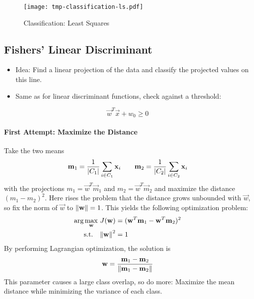 				\begin{figure}
					\centering
					\texttt{[image: tmp-classification-ls.pdf]}
					\caption{Classification: Least Squares}
					\label{fig:classificationLS}
				\end{figure}

		\subsection{Fishers' Linear Discriminant}
			\begin{itemize}
				\item Idea: Find a linear projection of the data and classify the projected values on this line.
				\item Same as for linear discriminant functions, check against a threshold:
			\end{itemize}
			\begin{equation}
				\vec{w}^T \vec{x} + w_0 \geq 0
			\end{equation}
			
			\paragraph{First Attempt: Maximize the Distance}
				Take the two means
				\begin{equation}
					\boldsymbol{\mathrm{m}}_1 = \frac{1}{\abs{C_1}} \sum_{i \in C_1} \boldsymbol{\mathrm{x}}_i \qquad \boldsymbol{\mathrm{m}}_2 = \frac{1}{\abs{C_2}} \sum_{i \in C_2} \boldsymbol{\mathrm{x}}_i
				\end{equation}
				with the projections \( m_1 = \vec{w}^T \vec{m}_1 \) and \( m_2 = \vec{w}^T \vec{m}_2 \) and maximize the distance \( (m_1 - m_2)^2 \). Here rises the problem that the distance grows unbounded with \(\vec{w}\), so fix the norm of \( \vec{w} \) to \( \norm{\boldsymbol{\mathrm{w}}} = 1 \). This yields the following optimization problem:
				\begin{align}
					\arg\max\limits_{\boldsymbol{\mathrm{w}}} \, J(\boldsymbol{\mathrm{w}}) &= (\boldsymbol{\mathrm{w}}^T \boldsymbol{\mathrm{m}}_1 - \boldsymbol{\mathrm{w}}^T \boldsymbol{\mathrm{m}}_2)^2 \\
					\textrm{s.t.} \quad
					\norm{\boldsymbol{\mathrm{w}}}^2 &= 1
				\end{align}
				By performing Lagrangian optimization, the solution is
				\begin{equation}
					\boldsymbol{\mathrm{w}} = \frac{\boldsymbol{\mathrm{m}}_1 - \boldsymbol{\mathrm{m}}_2}{\norm{\boldsymbol{\mathrm{m}}_1 - \boldsymbol{\mathrm{m}}_2}}
				\end{equation}
				This parameter causes a large class overlap, so do more: Maximize the mean distance while minimizing the variance of each class.
			
